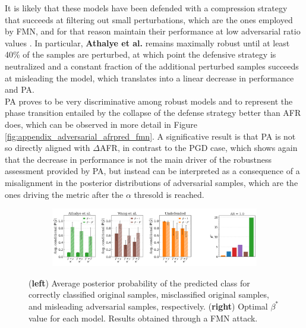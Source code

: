 It is likely that these models have been defended with a
compression strategy that succeeds at filtering out small perturbations, which are
the ones employed by FMN, and for that reason maintain their performance at low
adversarial ratio values \cite{dasKeepingBadGuys2017}.
In particular, {\color{tab:green} \textbf{Athalye et al.}} remains maximally robust
until at least 40\% of the samples are perturbed, at which point the defensive strategy
is neutralized and a constant fraction of the additional perturbed samples succeeds at
misleading the model, which translates into a linear decrease in performance and PA. \\

PA proves to be very discriminative among robust models and to represent the 
phase transition entailed by the collapse of the defense strategy better than AFR does, which can be
observed in more detail in Figure \ref{fig:appendix_adversarial_afrpred_fmn}. A significative
result is that PA is not so directly aligned with $\Delta$AFR, in contrast to
the PGD case, which shows again that the decrease in performance is not the main driver of
the robustness assessment provided by PA, but instead can be interpreted as a consequence of
a misalignment in the posterior distributions of adversarial samples, which are the ones driving
the metric after the $\alpha$ thresold is reached. \\

\begin{figure}[H]
    \centering
    \begin{subfigure}[b]{\textwidth}
        \centering
        \includegraphics[width=\textwidth]{img/results_discussion/adversarial/bpda_wang_undefended_beta_fmn.png}
    \end{subfigure}
   
    \caption{(\textbf{left}) Average posterior probability of the predicted class for 
    correctly classified original samples, misclassified original samples, and 
    misleading adversarial samples, respectively. (\textbf{right}) Optimal $\beta^{*}$ value for each model.
    Results obtained through a FMN attack.}
    \label{fig:unrobust_posterior_short_fmn}
\end{figure}

